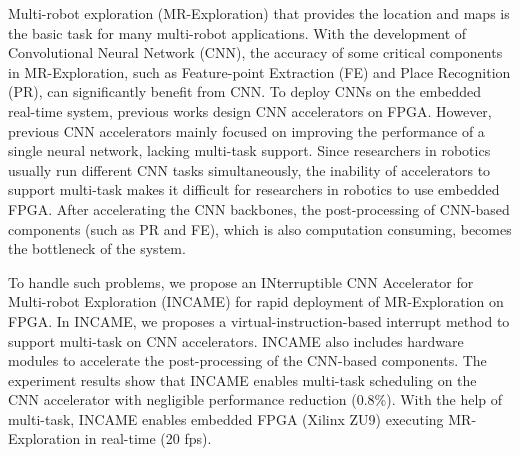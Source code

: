 Multi-robot exploration (MR-Exploration) that provides the location and maps is the basic task for many multi-robot applications. 
With the development of Convolutional Neural Network (CNN), the accuracy of some critical components in MR-Exploration, such as Feature-point Extraction (FE) and Place Recognition (PR), can significantly benefit from CNN. 
To deploy CNNs on the embedded real-time system, previous works design CNN accelerators on FPGA. 
However, previous CNN accelerators mainly focused on improving the performance of a single neural network, lacking multi-task support.
Since researchers in robotics usually run different CNN tasks simultaneously, the inability of accelerators to support multi-task makes it difficult for researchers in robotics to use embedded FPGA.
After accelerating the CNN backbones, the post-processing of  CNN-based components (such as PR and FE), which is also computation consuming, becomes the bottleneck of the system.

To handle such problems, we propose an INterruptible CNN Accelerator for Multi-robot Exploration (INCAME) for rapid deployment of MR-Exploration on FPGA.
In INCAME, we proposes a virtual-instruction-based interrupt method to support multi-task on CNN accelerators.
INCAME also includes hardware modules to accelerate the post-processing of the CNN-based components.
The experiment results show that INCAME enables multi-task scheduling on the CNN accelerator with negligible performance reduction (0.8\%). With the help of multi-task, INCAME enables embedded FPGA (Xilinx ZU9) executing MR-Exploration in real-time (20 fps).

